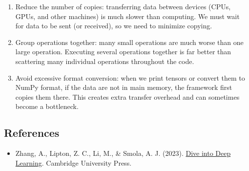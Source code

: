 \begin{enumerate}
\def\labelenumi{(\arabic{enumi})}
\item
  Reduce the number of copies: transferring data between devices (CPUs, GPUs, and other machines) is much slower than computing. We must wait for data to be sent (or received), so we need to minimize copying.
\item
  Group operations together: many small operations are much worse than one large operation. Executing several operations together is far better than scattering many individual operations throughout the code.
\item
  Avoid excessive format conversion: when we print tensors or convert them to NumPy format, if the data are not in main memory, the framework first copies them there. This creates extra transfer overhead and can sometimes become a bottleneck.
\end{enumerate}

\FloatBarrier
{}
\hypertarget{references-34}{%
\subsection{References}\label{references-34}}

\vspace{0.25em}
\begin{itemize}
\tightlist
\item
  Zhang, A., Lipton, Z. C., Li, M., \& Smola, A. J. (2023). \href{https://D2L.ai}{Dive into Deep Learning}. Cambridge University Press.
\end{itemize}

\clearpage
